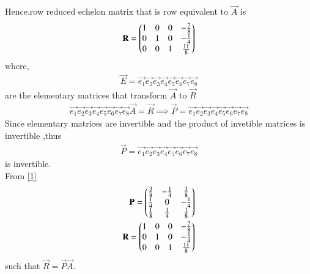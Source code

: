\documentclass[journal,12pt,twocolumn]{IEEEtran}
\begin{document}
Hence,row reduced echelon matrix that is row equivalent to $\vec{A}$ is
\begin{align}
\mathbf{R}=\begin{pmatrix}1&0&0&-\frac{7}{8}\\0&1&0&-\frac{1}{4}\\0&0&1&\frac{11}{8}\end{pmatrix}
\end{align}
where,
\begin{align}
    \Vec{E}=\vec{e_1}\vec{e_2}\vec{e_3}\vec{e_4}\vec{e_5}\vec{e_6}\vec{e_7}\vec{e_8}
\end{align}
are the elementary matrices that transform $\vec{A}$ to $\vec{R}$
\begin{align}
  \vec{e_1}\vec{e_2}\vec{e_3}\vec{e_4}\vec{e_5}\vec{e_6}\vec{e_7}\vec{e_8}\vec{A}=\vec{R}\implies\vec{P}=\vec{e_1}\vec{e_2}\vec{e_3}\vec{e_4}\vec{e_5}\vec{e_6}\vec{e_7}\vec{e_8}  
\end{align}
Since elementary matrices are invertible and the product of invetible matrices is invertible ,thus
\begin{align}
  \vec{P}=\vec{e_1}\vec{e_2}\vec{e_3}\vec{e_4}\vec{e_5}\vec{e_6}\vec{e_7}\vec{e_8}  
\end{align}
is invertible.\\
From \eqref{1}
\begin{align}
\mathbf{P}=\begin{pmatrix}\frac{3}{8}&-\frac{1}{4}&\frac{3}{8}\\\frac{1}{4}&0&-\frac{1}{4}\\\frac{1}{8}&\frac{1}{4}&\frac{1}{8}\end{pmatrix}\\
\mathbf{R}=\begin{pmatrix}1&0&0&-\frac{7}{8}\\0&1&0&-\frac{1}{4}\\0&0&1&\frac{11}{8}\end{pmatrix}
\end{align}
such that $\vec{R}=\vec{P}\vec{A}$.
\end{document}
